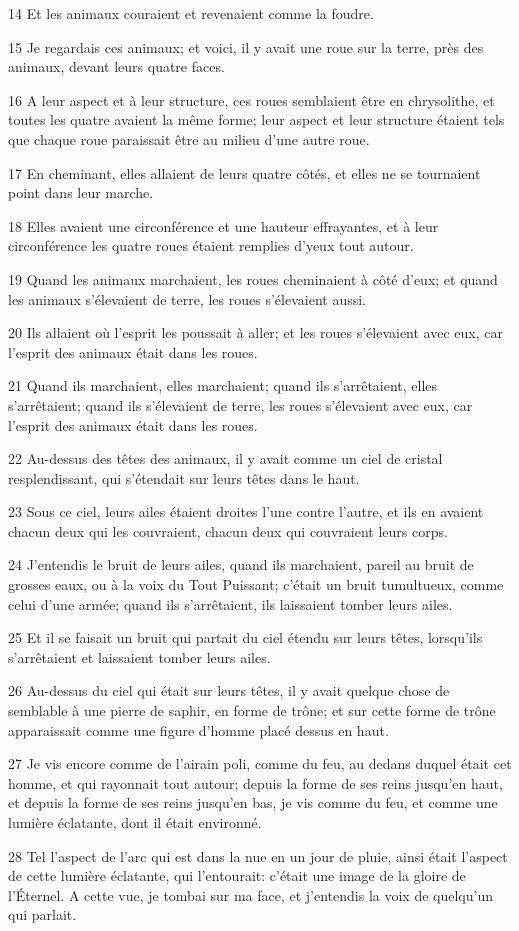 \par 14 Et les animaux couraient et revenaient comme la foudre.
\par 15 Je regardais ces animaux; et voici, il y avait une roue sur la terre, près des animaux, devant leurs quatre faces.
\par 16 A leur aspect et à leur structure, ces roues semblaient être en chrysolithe, et toutes les quatre avaient la même forme; leur aspect et leur structure étaient tels que chaque roue paraissait être au milieu d'une autre roue.
\par 17 En cheminant, elles allaient de leurs quatre côtés, et elles ne se tournaient point dans leur marche.
\par 18 Elles avaient une circonférence et une hauteur effrayantes, et à leur circonférence les quatre roues étaient remplies d'yeux tout autour.
\par 19 Quand les animaux marchaient, les roues cheminaient à côté d'eux; et quand les animaux s'élevaient de terre, les roues s'élevaient aussi.
\par 20 Ils allaient où l'esprit les poussait à aller; et les roues s'élevaient avec eux, car l'esprit des animaux était dans les roues.
\par 21 Quand ils marchaient, elles marchaient; quand ils s'arrêtaient, elles s'arrêtaient; quand ils s'élevaient de terre, les roues s'élevaient avec eux, car l'esprit des animaux était dans les roues.
\par 22 Au-dessus des têtes des animaux, il y avait comme un ciel de cristal resplendissant, qui s'étendait sur leurs têtes dans le haut.
\par 23 Sous ce ciel, leurs ailes étaient droites l'une contre l'autre, et ils en avaient chacun deux qui les couvraient, chacun deux qui couvraient leurs corps.
\par 24 J'entendis le bruit de leurs ailes, quand ils marchaient, pareil au bruit de grosses eaux, ou à la voix du Tout Puissant; c'était un bruit tumultueux, comme celui d'une armée; quand ils s'arrêtaient, ils laissaient tomber leurs ailes.
\par 25 Et il se faisait un bruit qui partait du ciel étendu sur leurs têtes, lorsqu'ils s'arrêtaient et laissaient tomber leurs ailes.
\par 26 Au-dessus du ciel qui était sur leurs têtes, il y avait quelque chose de semblable à une pierre de saphir, en forme de trône; et sur cette forme de trône apparaissait comme une figure d'homme placé dessus en haut.
\par 27 Je vis encore comme de l'airain poli, comme du feu, au dedans duquel était cet homme, et qui rayonnait tout autour; depuis la forme de ses reins jusqu'en haut, et depuis la forme de ses reins jusqu'en bas, je vis comme du feu, et comme une lumière éclatante, dont il était environné.
\par 28 Tel l'aspect de l'arc qui est dans la nue en un jour de pluie, ainsi était l'aspect de cette lumière éclatante, qui l'entourait: c'était une image de la gloire de l'Éternel. A cette vue, je tombai sur ma face, et j'entendis la voix de quelqu'un qui parlait.

